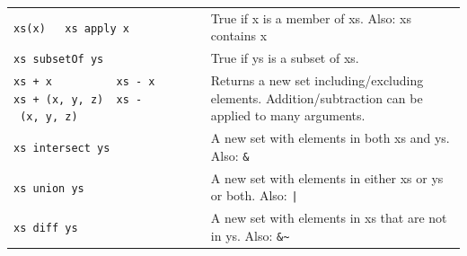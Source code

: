 \documentclass[article, a5paper]{memoir}
\renewcommand{\arraystretch}{0.9}
\begin{document}
{\small\renewcommand{\arraystretch}{1.15}
\begin{tabular}{@{}p{5cm}  p{6.6cm}}


\texttt{xs(x)~~~xs~apply~x} & True if x is a member of xs. Also: xs contains x\\   \cline{1-2}

\texttt{xs subsetOf ys} & True if ys is a subset of xs.\\\cline{1-2}

\texttt{xs~+~x~~~~~~~~~~xs - x} \newline \texttt{xs~+~(x,~y,~z)~~xs~-~(x,~y,~z)}& Returns a new set including/excluding elements. \newline Addition/subtraction can be applied to many arguments.\\   \cline{1-2}

\texttt{xs intersect ys} & A new set with elements in both xs and ys. Also: \texttt{\&} \\\cline{1-2}
\texttt{xs union ys} & A new set with elements in either xs or ys or both. Also: \texttt{|} \\\cline{1-2}
\texttt{xs diff ys} & A new set with elements in xs that are not in ys. Also: \texttt{\&\textasciitilde} \\\cline{1-2}
        
\end{tabular}
}  
\end{document}
